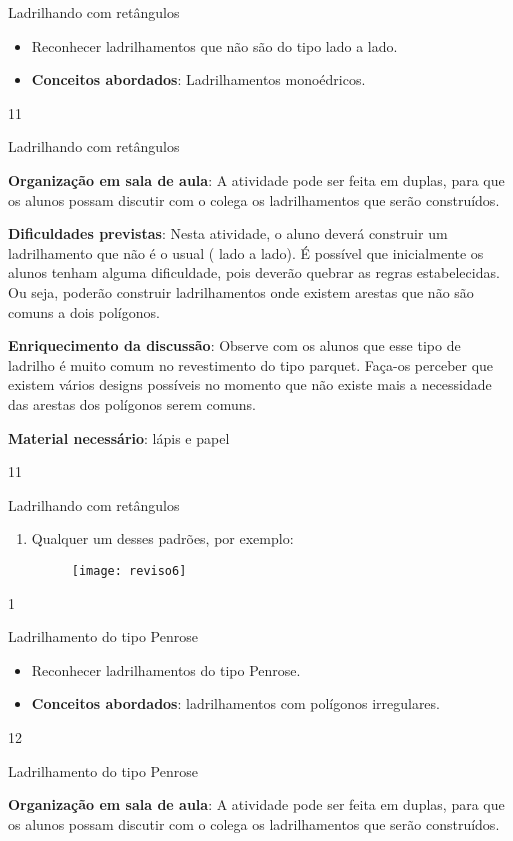 \cleardoublepage
\def\currentcolor{session1}
{
\begin{objectives}{Ladrilhando com retângulos}
{
	\begin{itemize}
	\item Reconhecer ladrilhamentos que não são do tipo lado a lado.
	\item \textbf{Conceitos abordados}: Ladrilhamentos monoédricos.
	\end{itemize}	
}{1}{1}
\end{objectives}
\begin{sugestions}{Ladrilhando com retângulos}
{
	\textbf{Organização em sala de aula}: A atividade pode ser feita em duplas, para que os alunos possam discutir com o colega os ladrilhamentos que serão construídos.

	\textbf{Dificuldades previstas}: Nesta atividade, o aluno deverá construir um ladrilhamento que não é o usual ( lado a lado). É possível que inicialmente os alunos tenham alguma dificuldade, pois deverão quebrar as regras estabelecidas. Ou seja, poderão construir ladrilhamentos onde existem arestas que não são comuns a dois polígonos.

	\textbf{Enriquecimento da discussão}: Observe com os alunos que esse tipo de ladrilho é muito comum no revestimento do tipo parquet. Faça-os perceber que existem vários designs possíveis no momento que não existe mais a necessidade das arestas dos polígonos serem comuns. 

	\textbf{Material necessário}: lápis e papel

}{1}{1}
\end{sugestions}
\begin{answer}{Ladrilhando com retângulos}
{
	\begin{enumerate}
	\item Qualquer um desses padrões, por exemplo:
	\begin{figure}[H]
	\centering
	\texttt{[image: reviso6]}
	\end{figure}
	\end{enumerate}
}{1}
\end{answer}
\begin{objectives}{Ladrilhamento do tipo Penrose}
{
	\begin{itemize}
	\item Reconhecer ladrilhamentos do tipo Penrose.
	\item \textbf{Conceitos abordados}: ladrilhamentos com polígonos irregulares.
	\end{itemize}
}{1}{2}
\end{objectives}
\begin{sugestions}{Ladrilhamento do tipo Penrose}
{
	\textbf{Organização em sala de aula}: A atividade pode ser feita em duplas, para que os alunos possam discutir com o colega os ladrilhamentos que serão construídos.

}
\end{sugestions}}
